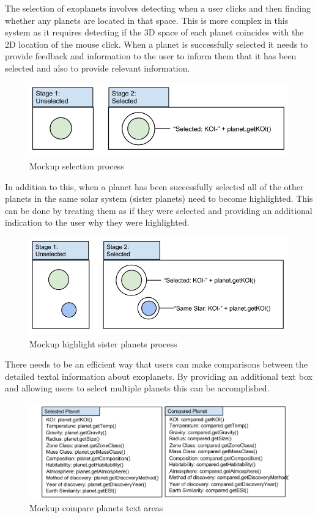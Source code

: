 \begin{enumerate}
The selection of exoplanets involves detecting when a user clicks and then
finding whether any planets are
located in that space. This is more complex in this system as it requires
detecting if the 3D space of each planet coincides with the 2D
location of the mouse click. When a planet is successfully selected it needs to
provide feedback and
information to the user to inform them that it has been selected and also to
provide relevant information.

\begin{figure}[H]
  \centering
      \includegraphics[width=.8\textwidth]{images/mockSelected.png}
  \caption{Mockup selection process}  
\end{figure}

In addition to this, when a planet has been successfully selected all of the
other planets in the
same solar system (sister planets) need to become highlighted. This can be done
by treating them as if they were selected and providing an additional indication
 to the user why they were highlighted.  
\begin{figure}[H]
  \centering
      \includegraphics[width=.8\textwidth]{images/selectedSisterPlanets.png}
  \caption{Mockup highlight sister planets process}  
\end{figure}

There needs to be an efficient way that users can make comparisons between the
detailed textal information about exoplanets. By providing an additional text
box and allowing users to select multiple planets this can be accomplished.

\begin{figure}[H]
  \centering
      \includegraphics[width=.7\textwidth]{images/mockComparePlanets.png}
  \caption{Mockup compare planets text areas}  
\end{figure}



\end{enumerate}
